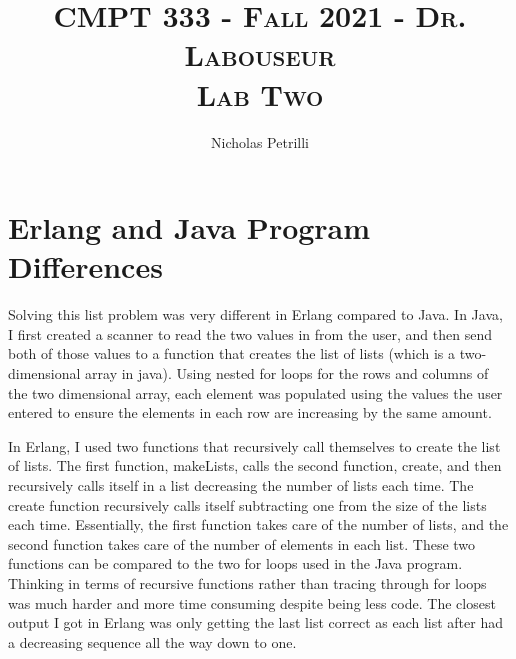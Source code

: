 \documentclass{article}
\author{Nicholas Petrilli }
\title{	
   \normalfont \normalsize 
   \textsc{CMPT 333 - Fall 2021 - Dr. Labouseur} \\[10pt] %
   \textsc{Lab Two}
}
\begin{document}
\maketitle

\section{Erlang and Java Program Differences}

Solving this list problem was very different in Erlang compared to Java. In Java, I first created a scanner to read the two values in from the user, and then send both of those values to a function that creates the list of lists (which is a two-dimensional array in java). Using nested for loops for the rows and columns of the two dimensional array, each element was populated using the values the user entered to ensure the elements in each row are increasing by the same amount.

In Erlang, I used two functions that recursively call themselves to create the list of lists. The first function, makeLists, calls the second function, create, and then recursively calls itself in a list decreasing the number of lists each time. The create function recursively calls itself subtracting one from the size of the lists each time. Essentially, the first function takes care of the number of lists, and the second function takes care of the number of elements in each list. These two functions can be compared to the two for loops used in the Java program. Thinking in terms of recursive functions rather than tracing through for loops was much harder and more time consuming despite being less code. The closest output I got in Erlang was only getting the last list correct as each list after had a decreasing sequence all the way down to one. 
\end{document}
